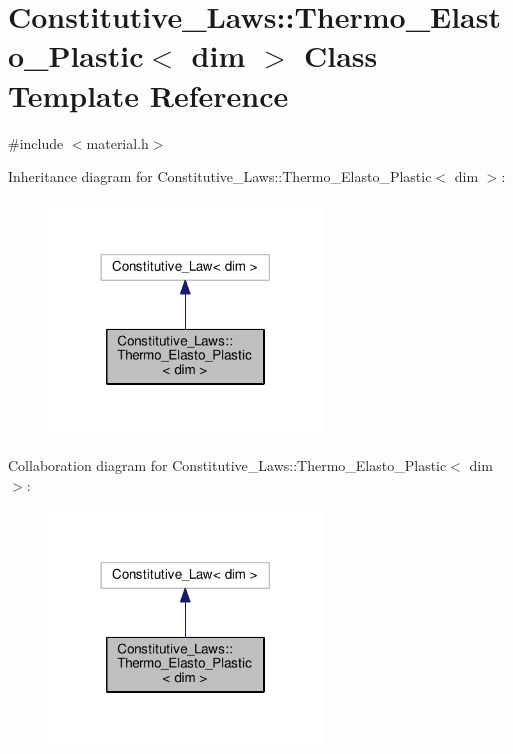 \hypertarget{classConstitutive__Laws_1_1Thermo__Elasto__Plastic}{}\section{Constitutive\+\_\+\+Laws\+:\+:Thermo\+\_\+\+Elasto\+\_\+\+Plastic$<$ dim $>$ Class Template Reference}
\label{classConstitutive__Laws_1_1Thermo__Elasto__Plastic}


{\ttfamily \#include $<$material.\+h$>$}



Inheritance diagram for Constitutive\+\_\+\+Laws\+:\+:Thermo\+\_\+\+Elasto\+\_\+\+Plastic$<$ dim $>$\+:\nopagebreak
\begin{figure}[H]
\begin{center}
\leavevmode
\includegraphics[width=206pt]{classConstitutive__Laws_1_1Thermo__Elasto__Plastic__inherit__graph}
\end{center}
\end{figure}


Collaboration diagram for Constitutive\+\_\+\+Laws\+:\+:Thermo\+\_\+\+Elasto\+\_\+\+Plastic$<$ dim $>$\+:\nopagebreak
\begin{figure}[H]
\begin{center}
\leavevmode
\includegraphics[width=206pt]{classConstitutive__Laws_1_1Thermo__Elasto__Plastic__coll__graph}
\end{center}
\end{figure}
